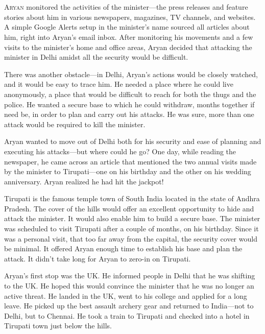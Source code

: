 \chapter{}

\lettrine{A}{ryan} monitored the activities of the minister—the press releases and feature
stories about him in various newspapers, magazines, TV channels, and websites. A simple
Google Alerts setup in the minister's name sourced all articles about him,
right into Aryan's email inbox. After monitoring his movements and a few
visits to the minister's home and office areas, Aryan decided that attacking the
minister in Delhi amidst all the security would be difficult.

There was another obstacle—in Delhi, Aryan's actions would be closely watched,
and it would be easy to trace him. He needed a place where he could live
anonymously, a place that would be difficult to reach for both the thugs and the
police. He wanted a secure base to which he could withdraw, months together if
need be, in order to plan and carry out his attacks. He was sure, more than
one attack would be required to kill the minister.

Aryan wanted to move out of Delhi both for his security and ease of planning and executing
his attacks—but where could he go? One day, while reading the newspaper, he came across
an article that mentioned the two annual visits made by the minister to
Tirupati—one on his birthday and the other on his wedding anniversary. Aryan
realized he had hit the jackpot!

Tirupati is the famous temple town of South India located in the state of Andhra
Pradesh. The cover of the hills would offer an excellent opportunity to hide and
attack the minister. It would also enable him to build a secure base. The
minister was scheduled to visit Tirupati after a couple of months, on his
birthday. Since it was a personal visit, that too far away from the capital, the
security cover would be minimal. It offered Aryan enough time to establish his
base and plan the attack. It didn't take long for Aryan to zero-in on Tirupati.

Aryan's first stop was the UK. He informed people in Delhi that he was shifting to the
UK. He hoped this would convince the minister that he was no longer an active
threat. He landed in the UK, went to his college and applied for a long leave. He
picked up the best assault archery gear and returned to India—not to Delhi,
but to Chennai. He took a train to Tirupati and checked into a hotel in
Tirupati town just below the hills.